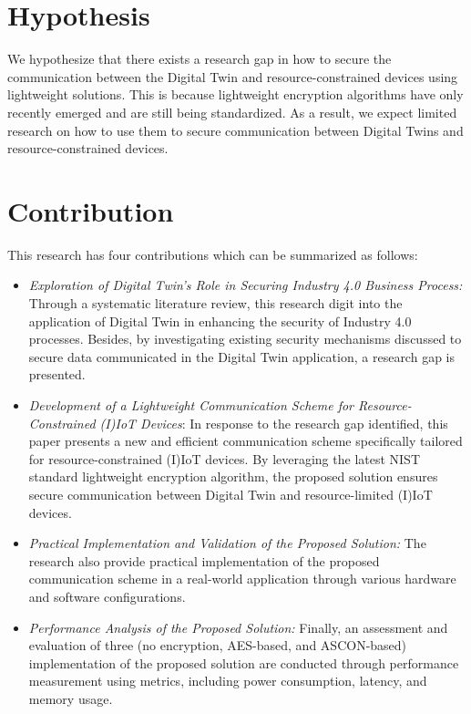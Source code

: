 \section{Hypothesis}
\label{sec:hypo}
We hypothesize that there exists a research gap in how to secure the communication between the Digital Twin and resource-constrained devices using lightweight solutions. This is because lightweight encryption algorithms have only recently emerged and are still being standardized. As a result, we expect limited research on how to use them to secure communication between Digital Twins and resource-constrained devices. 


\section{Contribution}
This research has four contributions which can be summarized as follows:
\begin{itemize}
    \item \textit{Exploration of Digital Twin's Role in Securing Industry 4.0 Business Process:} Through a systematic literature review, this research digit into the application of Digital Twin in enhancing the security of Industry 4.0 processes. Besides, by investigating existing security mechanisms discussed to secure data communicated in the Digital Twin application, a research gap is presented.   
    \item \textit{Development of a Lightweight Communication Scheme for Resource-Constrained (I)IoT Devices}: In response to the research gap identified, this paper presents a new and efficient communication scheme specifically tailored for resource-constrained (I)IoT devices. By leveraging the latest NIST standard lightweight encryption algorithm, the proposed solution ensures secure communication between Digital Twin and resource-limited (I)IoT devices. 
    \item \textit{Practical Implementation and Validation of the Proposed Solution:} The research also provide practical implementation of the proposed communication scheme in a real-world application through various hardware and software configurations. 
    \item \textit{Performance Analysis of the Proposed Solution:} Finally, an assessment and evaluation of three (no encryption, AES-based, and ASCON-based) implementation of the proposed solution are conducted through performance measurement using metrics, including power consumption, latency, and memory usage.
\end{itemize}

